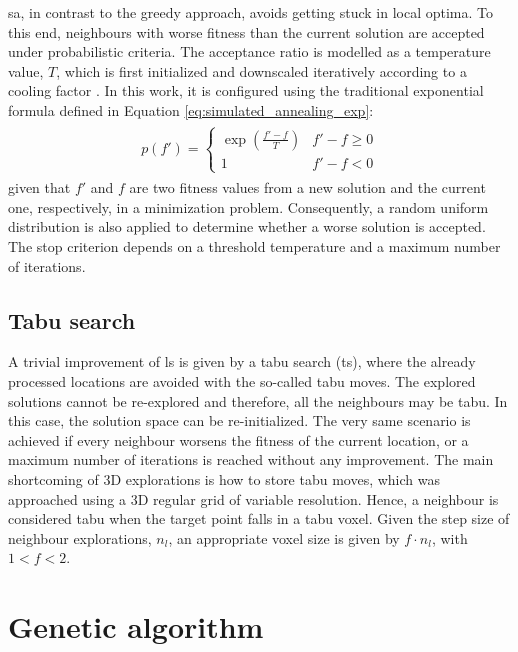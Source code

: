 \acrshort{sa}, in contrast to the greedy approach, avoids getting stuck in local optima. To this end, neighbours with worse fitness than the current solution are accepted under probabilistic criteria. The acceptance ratio is modelled as a temperature value, $T$, which is first initialized and downscaled iteratively according to a cooling factor \cite{wieckowski_finding_2020}. In this work, it is configured using the traditional exponential formula defined in Equation \ref{eq:simulated_annealing_exp}: 
\begin{gather}
    \label{eq:simulated_annealing_exp}
    \begin{aligned}
        p(f') =
        \begin{cases}
            \exp(\frac{f'-f}{T}) &f'-f \geq 0\\
            1 &f'-f < 0
        \end{cases}
    \end{aligned}
\end{gather}
given that $f'$ and $f$ are two fitness values from a new solution and the current one, respectively, in a minimization problem. Consequently, a random uniform distribution is also applied to determine whether a worse solution is accepted. The stop criterion depends on a threshold temperature and a maximum number of iterations.

\subsection{Tabu search}

A trivial improvement of \acrshort{ls} is given by a tabu search (\acrshort{ts}), where the already processed locations are avoided with the so-called tabu moves. The explored solutions cannot be re-explored and therefore, all the neighbours may be tabu. In this case, the solution space can be re-initialized. The very same scenario is achieved if every neighbour worsens the fitness of the current location, or a maximum number of iterations is reached without any improvement. The main shortcoming of 3D explorations is how to store tabu moves, which was approached using a 3D regular grid of variable resolution. Hence, a neighbour is considered tabu when the target point falls in a tabu voxel. Given the step size of neighbour explorations, $n_l$, an appropriate voxel size is given by $f \cdot n_l$, with $1 < f < 2$.

\section{Genetic algorithm}

